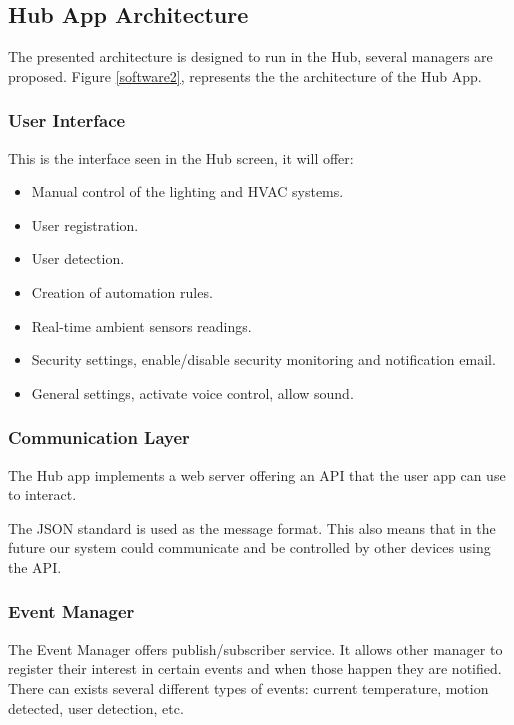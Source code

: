 \subsection{Hub App Architecture}

The presented architecture is designed to run in the Hub, several managers are proposed. Figure \ref{software2}, represents the the architecture of the Hub App.

\subsubsection{User Interface}
This is the interface seen in the Hub screen, it will offer:

\begin{itemize}
  \item Manual control of the lighting and HVAC systems.
  \item User registration.
  \item User detection.
  \item Creation of automation rules.
  \item Real-time ambient sensors readings.
  \item Security settings, enable/disable security monitoring and notification email.
  \item General settings, activate voice control, allow sound.
   
\end{itemize}

\subsubsection{Communication Layer}

The Hub app implements a web server offering an \ac{API} that the user app can use to interact. 

The \ac{JSON} standard is used as the message format. This also means that in the future our system could communicate and be controlled by other devices using the \ac{API}.

\subsubsection{Event Manager}
The Event Manager offers publish/subscriber service. It allows other manager to register their interest in certain events and when those happen they are notified. There can exists several different types of events: current temperature, motion detected, user detection, etc.

